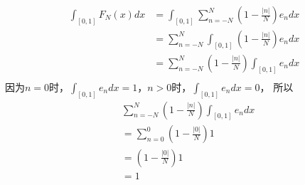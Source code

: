 \documentclass{article}
\begin{document}
\begin{itemize}
        \begin{align*}
          \int_{[0, 1]} F_N(x) dx
           & = \int_{[0, 1]} \sum \limits_{n = -N}^N (1 - \frac{|n|}{N})e_n dx  \\
           & = \sum \limits_{n = -N}^N \int_{[0, 1]} (1 - \frac{|n|}{N})e_n dx  \\
           & = \sum \limits_{n = -N}^N (1 - \frac{|n|}{N}) \int_{[0, 1]} e_n dx \\
        \end{align*}
        因为$n = 0$时，$\int_{[0, 1]} e_n dx = 1$，$n > 0$时，$\int_{[0, 1]} e_n dx = 0$，
        所以
        \begin{align*}
           & \sum \limits_{n = -N}^N (1 - \frac{|n|}{N}) \int_{[0, 1]} e_n dx \\
           & = \sum \limits_{n = 0}^0(1 - \frac{|0|}{N}) 1                      \\
           & = (1 - \frac{|0|}{N}) 1                                            \\
           & = 1
        \end{align*}




\end{itemize}
\end{document}
